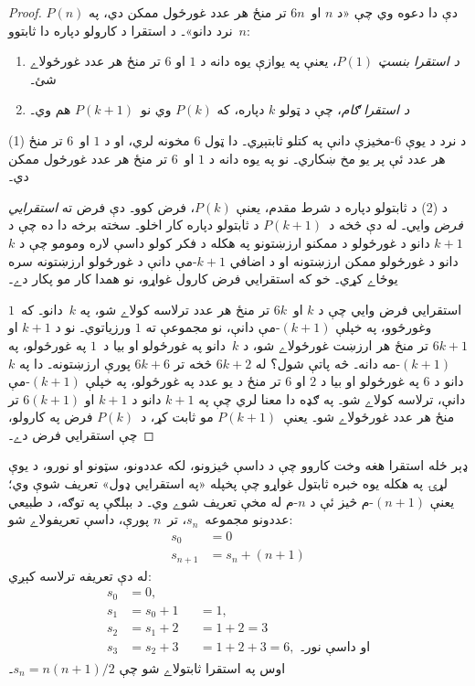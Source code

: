 \documentclass[../../../include/open-logic-section]{subfiles}
\begin{document}
\begin{proof}
$P(n)$ دې دا دعوه وي چې «د $n$ او~$6n$ تر منځ هر عدد
غورځول ممکن دي، په $n$~نرد دانو»۔ د استقرا د کارولو دپاره
دا ثابتوو:
\begin{enumerate}
\item \emph{د استقرا بنسټ} $P(1)$، يعنې په يوازې يوه دانه
  د $1$ او $6$ تر منځ هر عدد غورځولاے شئ۔
\item \emph{د استقرا ګام}، چې د ټولو $k$ دپاره، که $P(k)$
  وي نو~$P(k+1)$ هم وي۔
\end{enumerate}

(1) د نرد د يوې $6$-مخيزې دانې په کتلو ثابتېږي۔ دا ټول
6 مخونه لري، او د $1$ او~$6$ تر منځ هر عدد ئې پر يو مخ
ښکاري۔ نو په يوه دانه د $1$ او~$6$ تر منځ هر عدد غورځول
ممکن دي۔

د (2) د ثابتولو دپاره د شرط مقدم، يعنې $P(k)$، فرض کوو۔
دې فرض ته \emph{استقرايي فرض} وايي۔ له دې څخه د~$P(k+1)$
د ثابتولو دپاره کار اخلو۔ سخته برخه دا ده چې د $k+1$ دانو
د غورځولو د ممکنو ارزښتونو په هکله د فکر کولو داسې لاره
ومومو چې د $k$~دانو د غورځولو ممکن ارزښتونه او د اضافي
$k+1$-مې دانې د غورځولو ارزښتونه سره يوځاے کړي۔ خو که
استقرايي فرض کارول غواړو، نو همدا کار مو پکار دے۔

استقرايي فرض وايي چې د $k$ او~$6k$ تر منځ هر عدد ترلاسه
کولاے شو، په $k$~دانو۔ که~$1$ وغورځوو، په خپلې $(k+1)$-مې
دانې، نو مجموعې ته $1$ ورزياتوي۔ نو د $k+1$ او $6k+1$
تر منځ هر ارزښت غورځولاے شو، د $k$~دانو په غورځولو او
بيا د~$1$ په غورځولو، په $(k+1)$-مه دانه۔ څه پاتې شول؟ له $6k+2$
څخه تر $6k+6$ پورې ارزښتونه۔ دا په $k$ دانو د $6$ په
غورځولو او بيا د $2$ او $6$ تر منځ د يو عدد په غورځولو،
په خپلې $(k+1)$-مې دانې، ترلاسه کولاے شو۔ په ګډه دا
معنا لري چې په $k+1$ دانو د $k+1$ او $6(k+1)$ تر منځ
هر عدد غورځولاے شو۔ يعنې~$P(k+1)$ مو ثابت کړ، د~$P(k)$
فرض په کارولو، چې استقرايي فرض دے۔
\end{proof}

ډېر ځله استقرا هغه وخت کاروو چې د داسې څيزونو، لکه
عددونو، سټونو او نورو، د يوې لړۍ په هکله يوه خبره ثابتول
غواړو چې پخپله «په استقرايي ډول» تعريف شوې وي؛ يعنې
$(n+1)$-م څيز ئې د $n$-م له مخې تعريف شوے وي۔ د بېلګې
په توګه، د طبيعي عددونو مجموعه~$s_n$، تر~$n$ پورې، داسې
تعريفولاے شو:
\begin{align*}
  s_0 & = 0\\
  s_{n+1} & = s_n + (n+1)
\end{align*}
له دې تعريفه ترلاسه کېږي:
\begin{align*}
  s_0 & = 0,\\
  s_1 & = s_0 + 1 && = 1,\\
  s_2 & = s_1 + 2 && = 1 + 2 = 3\\
  s_3 & = s_2 + 3 && = 1 + 2 + 3 = 6, \text{ او داسې نور۔}
\end{align*}
اوس په استقرا ثابتولاے شو چې $s_n = n(n+1)/2$۔
\end{document}
